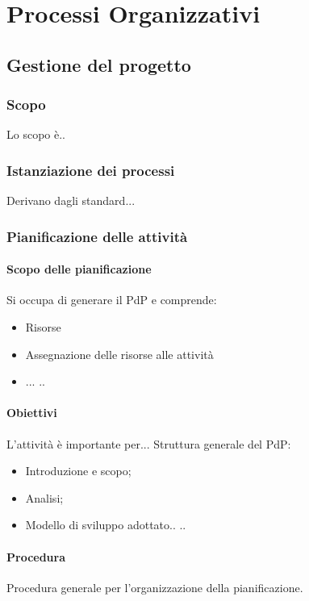 \section{Processi Organizzativi}

    \subsection{Gestione del progetto}

	    \subsubsection{Scopo}
	    Lo scopo è..
	    
	    \subsubsection{Istanziazione dei processi}
		Derivano dagli standard...
		
		\subsubsection{Pianificazione delle attività}
		
			\paragraph{Scopo delle pianificazione}
			Si occupa di generare il PdP e comprende:
			\begin{itemize}
				\item Risorse
				\item Assegnazione delle risorse alle attività
				\item ...
				..
			\end{itemize}
		
			\paragraph{Obiettivi}
			L'attività è importante per...
			Struttura generale del PdP:
			\begin{itemize}
				\item Introduzione e scopo;
				\item Analisi;
				\item Modello di sviluppo adottato..
				..
			\end{itemize}
		
			\paragraph{Procedura}	
			Procedura generale per l’organizzazione della pianificazione.
			
